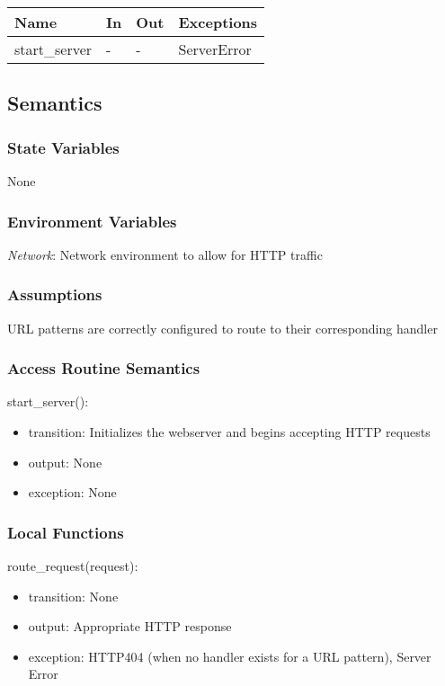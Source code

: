 \documentclass[12pt, titlepage]{article}
\begin{document}
\begin{center}
\begin{tabular}{p{3cm} p{4cm} p{4cm} p{5cm}}
\hline
\textbf{Name} & \textbf{In} & \textbf{Out} & \textbf{Exceptions} \\
\hline
start\_server & - & - & ServerError \\
\hline
\end{tabular}
\end{center}

\subsection{Semantics}

\subsubsection{State Variables}

None

\subsubsection{Environment Variables}

\textit{Network}: Network environment to allow for HTTP traffic 

\subsubsection{Assumptions}

URL patterns are correctly configured to route to their corresponding handler

\subsubsection{Access Routine Semantics}

\noindent start\_server():
\begin{itemize}
\item transition: Initializes the webserver and begins accepting HTTP requests
\item output: None
\item exception: None
\end{itemize}


\subsubsection{Local Functions}
\noindent route\_request(request):
\begin{itemize}
\item transition: None
\item output: Appropriate HTTP response
\item exception: HTTP404 (when no handler exists for a URL pattern), Server Error
\end{itemize}
\end{document}
